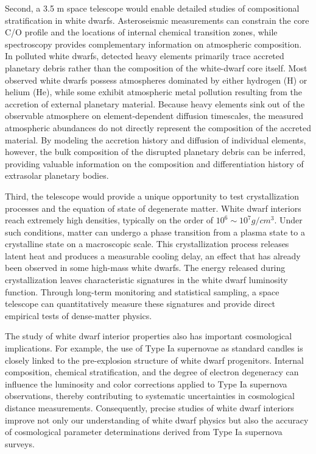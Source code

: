 Second, a 3.5 m space telescope would enable detailed studies of compositional stratification in white dwarfs. Asteroseismic measurements can constrain the core C/O profile and the locations of internal chemical transition zones, while spectroscopy provides complementary information on atmospheric composition. In polluted white dwarfs, detected heavy elements primarily trace accreted planetary debris rather than the composition of the white-dwarf core itself.
Most observed white dwarfs possess atmospheres dominated by either hydrogen (H) or helium (He), while some exhibit atmospheric metal pollution resulting from the accretion of external planetary material. Because heavy elements sink out of the observable atmosphere on element-dependent diffusion timescales, the measured atmospheric abundances do not directly represent the composition of the accreted material. By modeling the accretion history and diffusion of individual elements, however, the bulk composition of the disrupted planetary debris can be inferred, providing valuable information on the composition and differentiation history of extrasolar planetary bodies.

Third, the telescope would provide a unique opportunity to test crystallization processes and the equation of state of degenerate matter. White dwarf interiors reach extremely high densities, typically on the order of $10^6 \sim 10^7 g/cm^3$. Under such conditions, matter can undergo a phase transition from a plasma state to a crystalline state on a macroscopic scale. This crystallization process releases latent heat and produces a measurable cooling delay, an effect that has already been observed in some high-mass white dwarfs. The energy released during crystallization leaves characteristic signatures in the white dwarf luminosity function. Through long-term monitoring and statistical sampling, a space telescope can quantitatively measure these signatures and provide direct empirical tests of dense-matter physics.

The study of white dwarf interior properties also has important cosmological implications. For example, the use of Type Ia supernovae as standard candles is closely linked to the pre-explosion structure of white dwarf progenitors. Internal composition, chemical stratification, and the degree of electron degeneracy can influence the luminosity and color corrections applied to Type Ia supernova observations, thereby contributing to systematic uncertainties in cosmological distance measurements. Consequently, precise studies of white dwarf interiors improve not only our understanding of white dwarf physics but also the accuracy of cosmological parameter determinations derived from Type Ia supernova surveys.


